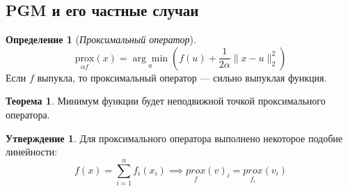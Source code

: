 \documentclass[11pt,a4paper]{report}
\theoremstyle{definition}
\theoremstyle{definition}
\newtheorem{theorem}{Теорема}[section]
\newtheorem{statement}{Утверждение}[section]
\theoremstyle{definition}
\newtheorem*{definition}{Определение}
\begin{document}
	\subsection{PGM и его частные случаи}
	\begin{definition}[\textit{Проксимальный оператор}]
		$$
			\underset{\alpha f}{\mathrm{prox}}(x) = \underset{u}{\arg\min} \left (f(u) + \frac{1}{2\alpha}\| x - u \|_2^2\right )
		$$
		Если $ f $ выпукла, то проксимальный оператор — сильно выпуклая функция.
	\end{definition}
	\begin{theorem}
		Минимум функции будет неподвижной точкой проксимального оператора.
	\end{theorem}
	\begin{statement}
		Для проксимального оператора выполнено некоторое подобие линейности:
		$$
			f(x) = \sum\limits_{i=1}^{n} f_{i}(x_i) \implies \underset{f}{prox}(v)_{i} = \underset{f_i}{prox}(v_i) 
		$$
	\end{statement}
\end{document}

